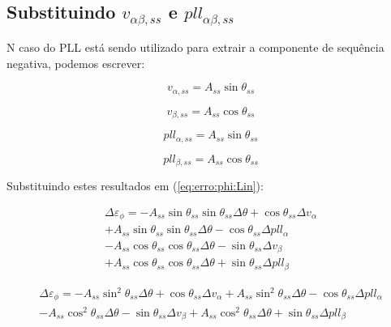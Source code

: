 \documentclass[12pt,a4paper]{report}
\begin{document}
\subsection{Substituindo $v_{\alpha\beta,ss}$ e $pll_{\alpha\beta,ss}$}


N caso do PLL está sendo utilizado para extrair a componente de sequência negativa, podemos escrever:

\begin{equation}
v_{\alpha,ss} = A_{ss} \sin \theta_{ss}
\end{equation}

\begin{equation}
v_{\beta,ss} = A_{ss} \cos \theta_{ss}
\end{equation}


\begin{equation}
pll_{\alpha,ss} = A_{ss} \sin \theta_{ss}
\end{equation}

\begin{equation}
pll_{\beta,ss} = A_{ss} \cos \theta_{ss}
\end{equation}


Substituindo estes resultados em (\ref{eq:erro:phi:Lin}):

\begin{multline}
\Delta \varepsilon_\phi = 
- A_{ss} \sin \theta_{ss} \sin \theta_{ss}  \Delta \theta
+ \cos \theta_{ss} \Delta v_{\alpha} \\
+ A_{ss} \sin \theta_{ss} \sin \theta_{ss}  \Delta \theta
- \cos \theta_{ss}  \Delta pll_\alpha \\
- A_{ss} \cos \theta_{ss} \cos \theta_{ss}  \Delta \theta
- \sin \theta_{ss} \Delta v_\beta \\
+ A_{ss} \cos \theta_{ss} \cos \theta_{ss}  \Delta \theta
+ \sin \theta_{ss}  \Delta pll_\beta
\end{multline}

\begin{multline}
\Delta \varepsilon_\phi = 
- A_{ss} \sin^2 \theta_{ss}  \Delta \theta
+ \cos \theta_{ss} \Delta v_{\alpha} 
+ A_{ss} \sin^2 \theta_{ss}   \Delta \theta
- \cos \theta_{ss}  \Delta pll_\alpha \\
- A_{ss} \cos^2 \theta_{ss}  \Delta \theta
- \sin \theta_{ss} \Delta v_\beta 
+ A_{ss} \cos^2 \theta_{ss}   \Delta \theta
+ \sin \theta_{ss}  \Delta pll_\beta
\end{multline}
\end{document}
